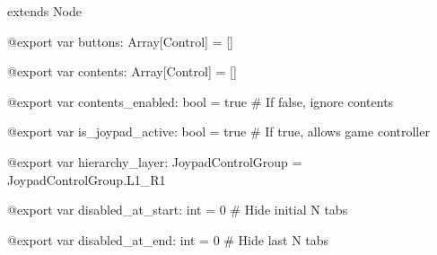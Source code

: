 extends Node

@export var buttons: Array{[}Control{]} = {[}{]}

@export var contents: Array{[}Control{]} = {[}{]}

@export var contents\_enabled: bool = true \# If false, ignore contents

@export var is\_joypad\_active: bool = true \# If true, allows game
controller

@export var hierarchy\_layer: JoypadControlGroup =
JoypadControlGroup.L1\_R1

@export var disabled\_at\_start: int = 0 \# Hide initial N tabs

@export var disabled\_at\_end: int = 0 \# Hide last N tabs
